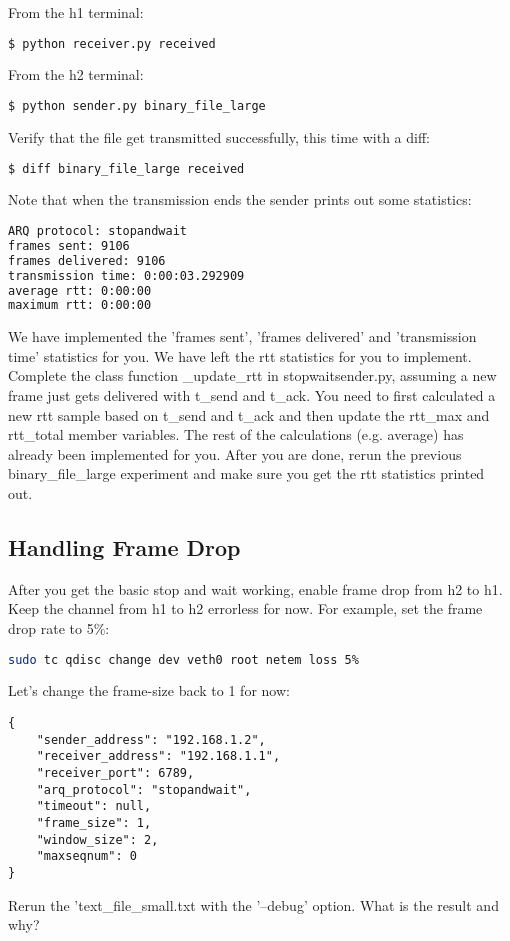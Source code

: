 \documentclass[11pt]{article}
\begin{document}
From the h1 terminal:
\begin{lstlisting}[language=bash]
$ python receiver.py received
\end{lstlisting}
From the h2 terminal:
\begin{lstlisting}[language=bash]
$ python sender.py binary_file_large
\end{lstlisting}


Verify that the file get transmitted successfully, this time with a diff:
\begin{lstlisting}[language=bash]
$ diff binary_file_large received
\end{lstlisting}

Note that when the transmission ends the sender prints out some statistics:

\begin{lstlisting}[language=bash]
ARQ protocol: stopandwait
frames sent: 9106
frames delivered: 9106
transmission time: 0:00:03.292909
average rtt: 0:00:00
maximum rtt: 0:00:00
\end{lstlisting}

We have implemented the 'frames sent', 'frames delivered' and 'transmission time' statistics for you. We have left the rtt statistics for you to implement. Complete the class function \_update\_rtt in stopwaitsender.py, assuming a new frame just gets delivered with t\_send and t\_ack. You need to first calculated a new rtt sample based on t\_send and t\_ack and then update the rtt\_max and rtt\_total member variables. The rest of the calculations (e.g. average) has already been implemented for you. After you are done, rerun the previous binary\_file\_large experiment and make sure you get the rtt statistics printed out.

\subsection{Handling Frame Drop}
After you get the basic stop and wait working, enable frame drop from h2 to h1. Keep the channel from h1 to h2 errorless for now. For example, set the frame drop rate to 5\%:
\begin{lstlisting}[language=bash]
sudo tc qdisc change dev veth0 root netem loss 5%
\end{lstlisting}
Let's change the frame-size back to 1 for now:

\begin{minipage}{\linewidth}
\begin{lstlisting}[caption={Configuration For Large File}]
{
    "sender_address": "192.168.1.2",
    "receiver_address": "192.168.1.1",
    "receiver_port": 6789,
    "arq_protocol": "stopandwait",
    "timeout": null,
    "frame_size": 1,
    "window_size": 2,
    "maxseqnum": 0
}
\end{lstlisting}
\end{minipage}
Rerun the 'text\_file\_small.txt with the '--debug' option. What is the result and why?
\end{document}
